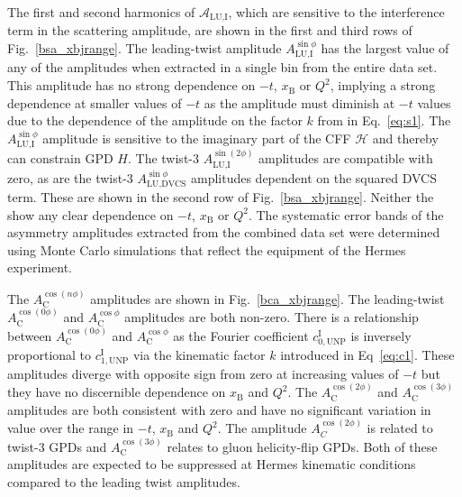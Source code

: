 The first and second harmonics of $\mathcal{A}_{\textrm{LU,I}}$, which are
sensitive to the interference term in the scattering amplitude, are shown in the first and third rows of Fig.~\ref{bsa_xbjrange}. The leading-twist amplitude $A_{\textrm{LU,I}}^{\sin\phi}$ has the largest value of any of the amplitudes when extracted in a single bin from the entire data set. This amplitude has no strong dependence on $-t$, $x_{\textrm{B}}$ or $Q^{2}$, implying a strong dependence at smaller values of $-t$ as the amplitude must diminish at  $-t$ values due to the dependence of the amplitude on the factor $k$ from in Eq.~\ref{eq:s1}. The $A_{\textrm{LU,I}}^{\sin\phi}$ amplitude is sensitive to the imaginary part of the CFF $\mathcal{H}$ and thereby can constrain GPD $\textit{H}$. The twist-3 $A_{\textrm{LU,I}}^{\sin(2\phi)}$ amplitudes are compatible with zero, as are the twist-3 $A_{\textrm{LU,DVCS}}^{\sin\phi}$ amplitudes dependent on the squared DVCS term. These  are shown in the second row of Fig.~\ref{bsa_xbjrange}. Neither the  show any clear dependence on $-t$, $x_{\textrm{B}}$ or $Q^{2}$. The systematic error bands of the asymmetry amplitudes extracted from the combined data set were determined using Monte Carlo simulations that reflect the equipment  of the H{\sc ermes} experiment. 

The $A_{\textrm{C}}^{\cos(n\phi)}$ amplitudes are shown in Fig.~\ref{bca_xbjrange}. The leading-twist $A_{\textrm{C}}^{\cos(0\phi)}$ and $A_{\textrm{C}}^{\cos\phi}$ amplitudes are both non-zero. There is a relationship between $A_{\textrm{C}}^{\cos(0\phi)}$ and $A_{\textrm{C}}^{\cos\phi}$ as the Fourier coefficient $c^{\textrm{I}}_{0,\textrm{UNP}}$ is inversely proportional to $c^{\textrm{I}}_{1,\textrm{UNP}}$ via the kinematic factor $k$ introduced in Eq~\ref{eq:c1}. These amplitudes diverge with opposite sign from zero at increasing values of $-t$ but they
have no discernible dependence on $x_{\textrm{B}}$ and $Q^{2}$. The $A_{\textrm{C}}^{\cos(2\phi)}$ and $A_{\textrm{C}}^{\cos(3\phi)}$ amplitudes are both consistent with zero and have no significant variation in value over the range in $-t$, $x_{\textrm{B}}$ and $Q^{2}$. The amplitude $A_{C}^{\cos(2\phi)}$ is related to twist-3 GPDs and $A_{\textrm{C}}^{\cos(3\phi)}$ relates to gluon helicity-flip GPDs. Both of these amplitudes are expected to be suppressed at H{\sc ermes} kinematic conditions compared to the leading twist amplitudes.

